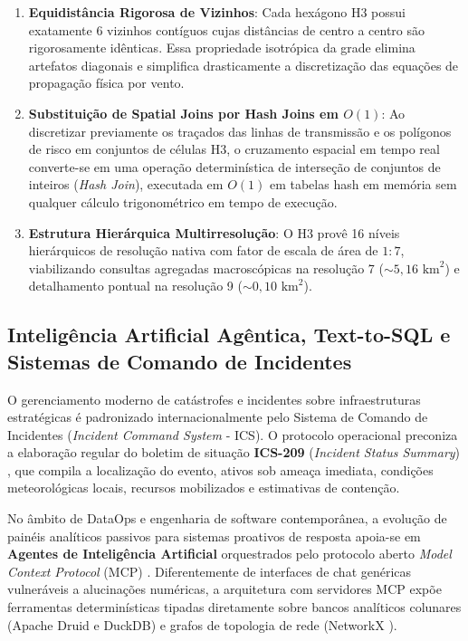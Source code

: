 \begin{enumerate}
    \item \textbf{Equidistância Rigorosa de Vizinhos}: Cada hexágono H3 possui exatamente 6 vizinhos contíguos cujas distâncias de centro a centro são rigorosamente idênticas. Essa propriedade isotrópica da grade elimina artefatos diagonais e simplifica drasticamente a discretização das equações de propagação física por vento.
    \item \textbf{Substituição de Spatial Joins por Hash Joins em $O(1)$}: Ao discretizar previamente os traçados das linhas de transmissão e os polígonos de risco em conjuntos de células H3, o cruzamento espacial em tempo real converte-se em uma operação determinística de interseção de conjuntos de inteiros (\textit{Hash Join}), executada em $O(1)$ em tabelas hash em memória sem qualquer cálculo trigonométrico em tempo de execução.
    \item \textbf{Estrutura Hierárquica Multirresolução}: O H3 provê 16 níveis hierárquicos de resolução nativa com fator de escala de área de $1:7$, viabilizando consultas agregadas macroscópicas na resolução 7 ($\sim 5,16\text{ km}^2$) e detalhamento pontual na resolução 9 ($\sim 0,10\text{ km}^2$).
\end{enumerate}

\subsection{Inteligência Artificial Agêntica, Text-to-SQL e Sistemas de Comando de Incidentes}
\label{sbc:ia_agentica_ics}

O gerenciamento moderno de catástrofes e incidentes sobre infraestruturas estratégicas é padronizado internacionalmente pelo Sistema de Comando de Incidentes (\textit{Incident Command System} - ICS). O protocolo operacional preconiza a elaboração regular do boletim de situação \textbf{ICS-209} (\textit{Incident Status Summary}) \cite{fema2020ics209}, que compila a localização do evento, ativos sob ameaça imediata, condições meteorológicas locais, recursos mobilizados e estimativas de contenção.

No âmbito de DataOps e engenharia de software contemporânea, a evolução de painéis analíticos passivos para sistemas proativos de resposta apoia-se em \textbf{Agentes de Inteligência Artificial} orquestrados pelo protocolo aberto \textit{Model Context Protocol} (MCP) \cite{anthropic2024mcp}. Diferentemente de interfaces de chat genéricas vulneráveis a alucinações numéricas, a arquitetura com servidores MCP expõe ferramentas determinísticas tipadas diretamente sobre bancos analíticos colunares (Apache Druid \cite{yang2014druid} e DuckDB) e grafos de topologia de rede (NetworkX \cite{hagberg2008exploring}).

